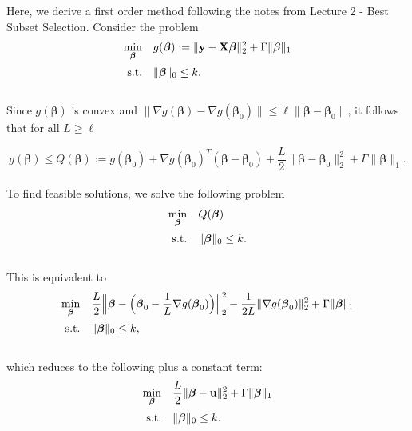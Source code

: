 \documentclass[12pt]{article}
\newcommand{\M}{\mathbf}
\newcommand{\MS}{\boldsymbol}
\newcommand{\1}{\mathds{1}}
\begin{document}
Here, we derive a first order method following the notes from Lecture 2 - Best Subset Selection.  Consider the problem
\begin{equation}
\begin{array}{rll}
  \min \limits_{\MS \beta} & g(\MS \beta) := \|\M y - \M X \MS \beta \|_2^2 + \Gamma \| \MS \beta \|_1 \vspace{5pt}\\
  \text{s.t.} & \| \MS \beta \|_0 \le k.
\end{array}
\end{equation}\\

Since $g(\MS \beta)$ is convex and $\|\nabla g(\MS \beta) - \nabla g(\MS \beta_0)\| \le \ell \| \MS \beta - \MS \beta_0\|$, it follows that for all $L \ge \ell$

\begin{equation}
g(\MS \beta) \le Q(\MS \beta) := g(\MS \beta_0) + \nabla g(\MS \beta_0)^T(\MS \beta - \MS \beta_0) + \frac{L}{2} \|\MS \beta - \MS \beta_0\|_2^2 + \Gamma \| \MS \beta \|_1.
\end{equation}\\

To find feasible solutions, we solve the following problem
\begin{equation}
\begin{array}{rll}
  \min \limits_{\MS \beta} & Q(\MS \beta) \vspace{5pt}\\
  \text{s.t.} & \| \MS \beta \|_0 \le k.
\end{array}
\end{equation}\\

This is equivalent to
\begin{equation}
\begin{array}{rll}
  \min \limits_{\MS \beta} & \displaystyle \frac{L}{2}\Big\|\MS \beta - \Big(\MS \beta_0 - \frac{1}{L} \nabla g(\MS \beta_0)\Big) \Big\|_2^2 - \frac{1}{2L} \|\nabla g(\MS \beta_0) \|_2^2 + \Gamma \| \MS \beta \|_1 \vspace{5pt}\\
  \text{s.t.} & \| \MS \beta \|_0 \le k,
\end{array}
\end{equation}\\

which reduces to the following plus a constant term:
\begin{equation}
\label{u_prob}
\begin{array}{rll}
  \min \limits_{\MS \beta} & \displaystyle \frac{L}{2}\|\MS \beta - \M u \|_2^2 + \Gamma \| \MS \beta \|_1 \vspace{5pt}\\
  \text{s.t.} & \| \MS \beta \|_0 \le k.
\end{array}
\end{equation}\\
\end{document}
